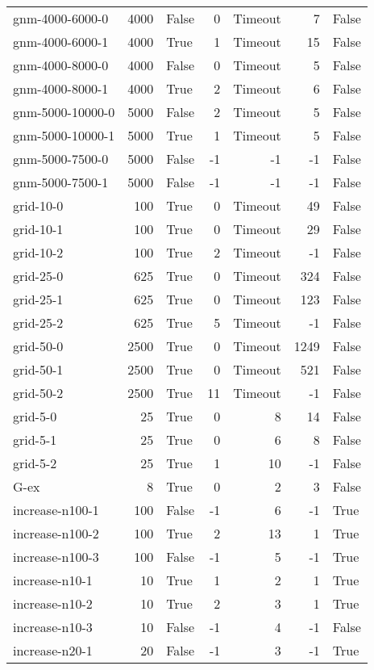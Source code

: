 \begin{longtable}{lrlrrrl}
gnm-4000-6000-0 & 4000 & False & 0 & Timeout & 7 & False \\
gnm-4000-6000-1 & 4000 & True & 1 & Timeout & 15 & False \\
gnm-4000-8000-0 & 4000 & False & 0 & Timeout & 5 & False \\
gnm-4000-8000-1 & 4000 & True & 2 & Timeout & 6 & False \\
gnm-5000-10000-0 & 5000 & False & 2 & Timeout & 5 & False \\
gnm-5000-10000-1 & 5000 & True & 1 & Timeout & 5 & False \\
gnm-5000-7500-0 & 5000 & False & -1 & -1 & -1 & False \\
gnm-5000-7500-1 & 5000 & False & -1 & -1 & -1 & False \\
grid-10-0 & 100 & True & 0 & Timeout & 49 & False \\
grid-10-1 & 100 & True & 0 & Timeout & 29 & False \\
grid-10-2 & 100 & True & 2 & Timeout & -1 & False \\
grid-25-0 & 625 & True & 0 & Timeout & 324 & False \\
grid-25-1 & 625 & True & 0 & Timeout & 123 & False \\
grid-25-2 & 625 & True & 5 & Timeout & -1 & False \\
grid-50-0 & 2500 & True & 0 & Timeout & 1249 & False \\
grid-50-1 & 2500 & True & 0 & Timeout & 521 & False \\
grid-50-2 & 2500 & True & 11 & Timeout & -1 & False \\
grid-5-0 & 25 & True & 0 & 8 & 14 & False \\
grid-5-1 & 25 & True & 0 & 6 & 8 & False \\
grid-5-2 & 25 & True & 1 & 10 & -1 & False \\
G-ex & 8 & True & 0 & 2 & 3 & False \\
increase-n100-1 & 100 & False & -1 & 6 & -1 & True \\
increase-n100-2 & 100 & True & 2 & 13 & 1 & True \\
increase-n100-3 & 100 & False & -1 & 5 & -1 & True \\
increase-n10-1 & 10 & True & 1 & 2 & 1 & True \\
increase-n10-2 & 10 & True & 2 & 3 & 1 & True \\
increase-n10-3 & 10 & False & -1 & 4 & -1 & False \\
increase-n20-1 & 20 & False & -1 & 3 & -1 & True \\

\end{longtable}
